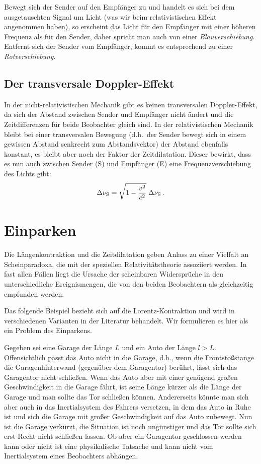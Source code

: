 Bewegt sich der Sender auf den Empf\"anger
zu und handelt es sich bei dem ausgetauschten
Signal um Licht (was wir beim relativistischen
Effekt angenommen haben), so erscheint das
Licht f\"ur den Empf\"anger mit einer h\"oheren
Frequenz als f\"ur den Sender, daher spricht
man auch von einer {\em Blauverschiebung}.
Entfernt sich der Sender vom Empf\"anger, kommt
es entsprechend zu einer {\em Rotverschiebung}. 

\subsection{Der transversale Doppler-Effekt}

In der nicht-relativistischen Mechanik gibt es keinen
transversalen Doppler-Effekt, da sich der Abstand
zwischen Sender und Empf\"anger nicht \"andert
und die Zeitdifferenzen f\"ur beide Beobachter gleich
sind. In der relativistischen Mechanik bleibt bei 
einer transversalen Bewegung (d.h.\ der Sender
bewegt sich in einem gewissen Abstand senkrecht
zum Abstandsvektor) der Abstand ebenfalls 
konstant, es bleibt aber noch der Faktor
der Zeitdilatation. Dieser bewirkt, dass es
nun auch zwischen Sender (S) und Empf\"anger (E)
eine Frequenzverschiebung des Lichts gibt:
\begin{equation}
      \Delta \nu_{\rm S} = \sqrt{1 - \frac{v^2}{c^2}}\; \Delta \nu_{\rm S} \, . 
\end{equation}

\section{\glqq Einparken\grqq} 
\label{sec_Parken}

Die L\"angenkontraktion und die Zeitdilatation
geben Anlass zu einer Vielfalt an Scheinparadoxa,
die mit der speziellen Relativit\"atstheorie
assoziiert werden. In fast allen F\"allen liegt die Ursache der scheinbaren 
Widerspr\"uche in den unterschiedliche Ereignismengen, die von den beiden
Beobachtern als gleichzeitig empfunden werden.

Das folgende Beispiel bezieht sich auf die Lorentz-Kontraktion und wird in verschiedenen
Varianten in der Literatur behandelt. Wir formulieren es hier als ein Problem des
Einparkens.

Gegeben sei eine Garage der L\"ange $L$ und ein Auto der L\"ange $l>L$. Offensichtlich passt
das Auto nicht in die Garage, d.h., wenn die Frontsto\ss stange die Garagenhinterwand
(gegen\"uber dem Garagentor)
ber\"uhrt, l\"asst sich das Garagentor nicht
schlie\ss en. Wenn das Auto aber mit
einer gen\"ugend gro\ss en Geschwindigkeit
in die Garage f\"ahrt, ist seine L\"ange 
k\"urzer als die L\"ange der Garage und man
sollte das Tor schlie\ss en k\"onnen. 
Andererseits k\"onnte man sich aber auch
in das Inertialsystem des Fahrers versetzen, in 
dem das Auto in Ruhe ist und
sich die Garage mit gro\ss er
Geschwindigkeit auf das Auto zubewegt.
Nun ist die Garage verk\"urzt, die Situation
ist noch ung\"unstiger und das Tor sollte sich
erst Recht nicht schlie\ss en lassen. Ob
aber ein Garagentor geschlossen werden
kann oder nicht ist eine physikalische Tatsache
und kann nicht vom Inertialsystem eines
Beobachters abh\"angen.

